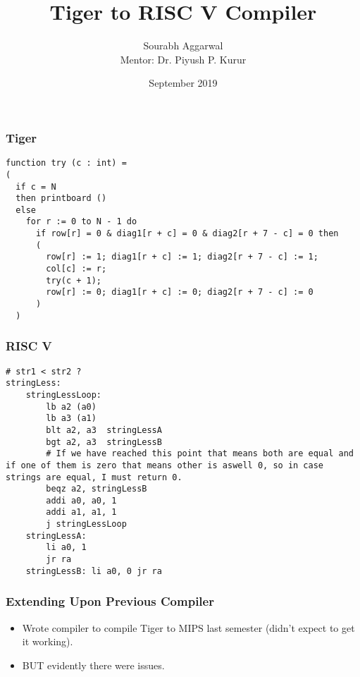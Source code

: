 \documentclass{beamer}
\title{Tiger to RISC V Compiler}
\author{Sourabh Aggarwal\\ Mentor: Dr. Piyush P. Kurur}
\institute[IIT Palakkad] %
{
  Department of Computer Science And Engineering\\
  IIT Palakkad
}
\date{September 2019}
\newcommand{\iph}[2]{
    \texttt{[image: \#2]}
}
\begin{document}
\begin{frame}
  \titlepage
\end{frame}

\begin{frame}[fragile]
  \frametitle{Tiger}
  \begin{verbatim}
function try (c : int) = 
( 
  if c = N
  then printboard ()
  else 
    for r := 0 to N - 1 do 
      if row[r] = 0 & diag1[r + c] = 0 & diag2[r + 7 - c] = 0 then 
      (
        row[r] := 1; diag1[r + c] := 1; diag2[r + 7 - c] := 1;
        col[c] := r;
        try(c + 1);
        row[r] := 0; diag1[r + c] := 0; diag2[r + 7 - c] := 0
      )
  )
  \end{verbatim}
\end{frame}

\begin{frame}[fragile]
  \frametitle{RISC V}
  \begin{verbatim}
# str1 < str2 ?
stringLess:
    stringLessLoop:
        lb a2 (a0)
        lb a3 (a1)
        blt a2, a3  stringLessA
        bgt a2, a3  stringLessB
        # If we have reached this point that means both are equal and if one of them is zero that means other is aswell 0, so in case strings are equal, I must return 0.
        beqz a2, stringLessB
        addi a0, a0, 1
        addi a1, a1, 1
        j stringLessLoop
    stringLessA:
        li a0, 1
        jr ra
    stringLessB: li a0, 0 jr ra 
  \end{verbatim}
\end{frame}

\begin{frame}[fragile]
  \frametitle{Extending Upon Previous Compiler}
  \begin{itemize}
    \item Wrote compiler to compile Tiger to MIPS last semester (didn't expect to get it working). 
    \pause
    \item BUT evidently there were issues.
  \end{itemize}
\end{frame}
\end{document}
